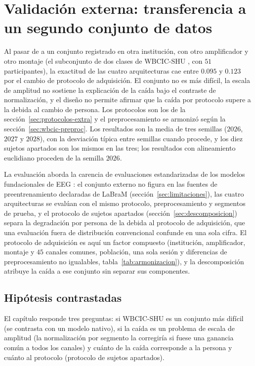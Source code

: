 \chapter{Validación externa: transferencia a un segundo conjunto de datos}
\label{cap:validacion-externa}

Al pasar de \openbmi{} a un conjunto registrado en otra institución, con otro amplificador y otro
montaje (el subconjunto de dos clases de WBCIC-SHU \cite{yang2025wbcic}, con $51$ participantes), la
exactitud de las cuatro arquitecturas cae entre $0.095$ y $0.123$ por el cambio de protocolo de adquisición.
El conjunto no es más difícil, la escala de amplitud no sostiene la explicación de la caída bajo el contraste
de normalización, y el diseño no permite afirmar que la caída por protocolo supere a la debida al cambio de
persona. Los protocolos son los de la
sección~\ref{sec:protocolos-extra} y el preprocesamiento se armonizó según la
sección~\ref{sec:wbcic-preproc}. Los resultados son la media de tres semillas ($2026$, $2027$ y $2028$), con
la desviación típica entre semillas cuando procede, y los diez sujetos apartados son los mismos en las tres;
los resultados con alineamiento euclidiano proceden de la semilla $2026$.

La evaluación aborda la carencia de evaluaciones estandarizadas de los modelos fundacionales de EEG
\cite{kuruppu2026fmreview}: el conjunto externo no figura en las fuentes de preentrenamiento declaradas de
LaBraM (sección~\ref{sec:limitaciones}), las cuatro arquitecturas se evalúan con el mismo protocolo,
preprocesamiento y segmentos de prueba, y el protocolo de sujetos apartados
(sección~\ref{sec:descomposicion}) separa la degradación por persona de la debida al protocolo de
adquisición, que una evaluación fuera de distribución convencional confunde en una sola cifra. El
protocolo de adquisición es aquí un factor compuesto (institución, amplificador, montaje y $45$ canales
comunes, población, una sola sesión y diferencias de preprocesamiento no igualables,
tabla~\ref{tab:armonizacion}), y la descomposición atribuye la caída a ese conjunto sin separar sus
componentes.

\section{Hipótesis contrastadas}

El capítulo responde tres preguntas: si WBCIC-SHU es un conjunto más difícil (se contrasta con un modelo
nativo), si la caída es un problema de escala de amplitud (la normalización por segmento la corregiría si fuese
una ganancia común a todos los canales) y cuánto de la caída corresponde a la persona y cuánto al protocolo
(protocolo de sujetos apartados).

